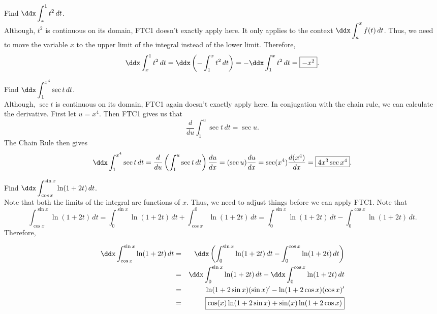 \documentclass{book}
\newcommand{\dt}{\,dt}
\newcommand{\dint}{\displaystyle \int}
\begin{document}
\begin{Exam} Find $\ddx\dint_x^1 t^2\dt$.\\
Although, $t^2$ is continuous on its domain, FTC1 doesn't exactly apply here. It only applies to the context $\ddx\dint_a^{x} f(t)\dt$. Thus, we need to move the variable $x$ to the upper limit of the integral instead of the lower limit. Therefore, 
\[\ddx\dint_x^1 t^2\dt = \ddx\left(-\dint^x_1 t^2\dt\right) = -\ddx\dint^x_1 t^2\dt = \fbox{$-x^2$}.\]
\end{Exam}\vs

\begin{Exam} Find $\ddx\dint_1^{x^4} \sec t\dt$. \\
Although, $\sec t$ is continuous on its domain,  FTC1 again doesn't exactly apply here. In conjugation with the chain rule, we can calculate the derivative. First let $u = x^4$. Then FTC1 gives us that \[\dfrac{d}{du}\int_1^u \sec t\dt = \sec u.\] The Chain Rule then gives 
\[\ddx\int_1^{x^4} \sec t\dt = \dfrac{d}{du}\left(\int_1^u \sec t\dt\right) \dfrac{du}{dx} = (\sec u) \dfrac{du}{dx} = \sec (x^4) \dfrac{d(x^4)}{dx} = \fbox{$4x^3\sec x^4$}.\]
\end{Exam}\vs

\begin{Exam} Find $\ddx\dint_{\cos x}^{\sin x} \ln(1+2t)\dt$.\\
Note that both the limits of the integral are functions of $x$. Thus, we need to adjust things before we can apply FTC1. Note that 
\[\dint_{\cos x}^{\sin x} \ln(1+2t)\dt = \dint_{0}^{\sin x} \ln(1+2t)\dt + \dint_{\cos x}^{0} \ln(1+2t)\dt = \dint_{0}^{\sin x} \ln(1+2t)\dt - \dint^{\cos x}_{0} \ln(1+2t)\dt.\] Therefore, \vspace{-15pt}

\begin{eqnarray*}
\ddx\dint_{\cos x}^{\sin x} \ln(1+2t)\dt &=& \ddx\left(\dint_{0}^{\sin x} \ln(1+2t)\dt - \dint^{\cos x}_{0} \ln(1+2t)\dt\right)\\
&=& \ddx\dint_{0}^{\sin x} \ln(1+2t)\dt - \ddx\dint^{\cos x}_{0} \ln(1+2t)\dt\\
&=& \ln(1+2\sin x)(\sin x)' - \ln(1+2\cos x)(\cos x)'\\
&=& \fbox{$\cos (x)\ln(1+2\sin x) + \sin (x)\ln(1+2\cos x)$}
\end{eqnarray*}
\end{Exam}


\vfill
{}
\pagebreak
\end{document}
